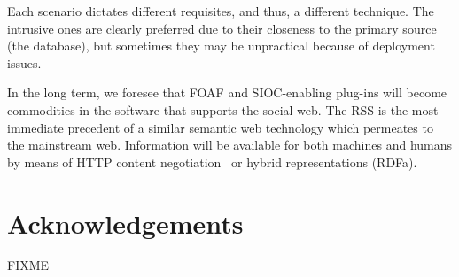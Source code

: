 \documentclass{../templates/www2008-submission}
\begin{document}
Each scenario dictates different requisites, and thus, a different
technique. The intrusive ones are clearly preferred due to their
closeness to the primary source (the database), but sometimes they may be
unpractical because of deployment issues.

In the long term, we foresee that FOAF and SIOC-enabling plug-ins
will become commodities in the software that supports the social
web. The RSS is the most immediate precedent of a similar semantic web
technology which permeates to the mainstream web. Information will
be available for both machines and humans by means of HTTP
content negotiation~\cite{Recipes} or hybrid representations (RDFa).


\section*{Acknowledgements}

FIXME





\balancecolumns
\end{document}
